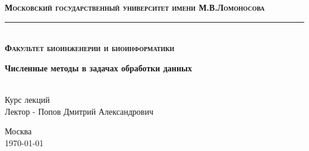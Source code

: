 \begin{titlepage}

\newcommand{\HRule}{\rule{\linewidth}{0.3mm}} %

\center

\textbf{\textsc{\Large Московский государственный университет} \textsc{\large имени }\textsc{\Large М.В.Ломоносова}}
\\[0.3cm] 
\HRule 
\\[0.3cm]
\textbf{\textsc{\large Факультет биоинженерии и биоинформатики}}
\\[4.0cm]

\begin{spacing}{1.4}
{ \LARGE \bfseries Численные методы в задачах обработки данных} \\[1.0cm]

\end{spacing}
 
 
\Large \emph{}\\
Курс лекций \\
Лектор - Попов Дмитрий Александрович
\\[4cm]

\begin{abstract}
	Курс включает обзор основных численных методов, применяемых при обработке экспериментальных данных. Основные темы курса: полиномиальная аппроксимация, интерполяция, сплайны, численное дифференцирование и интегрирование, метод наименьших квадратов, методы решения систем линейных уравнений, решение нелинейных уравнений и оптимизация, анализ Фурье.
	
	
	\footnotesize{Исходные материалы \href{https://github.com/litvinanna/num_analysis}{github.com/litvinanna/num_analysis}. }
\end{abstract}


\vfill

{\large Москва \\ \today}


\end{titlepage}

